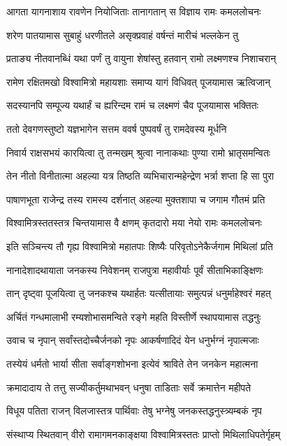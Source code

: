 \twolineshloka
{आगता यागनाशाय रावणेन नियोजिताः}
{तानागतान् स विज्ञाय रामः कमललोचनः} %

\twolineshloka
{शरेण पातयामास सुबाहुं धरणीतले}
{असृक्प्रवाहं वर्षन्तं मारीचं भल्लकेन तु} %

\twolineshloka
{प्रताङ्य नीतवानब्धिं यथा पर्णं तु वायुना}
{शेषांस्तु हतवान् रामो लक्ष्मणश्च निशाचरान्} %

\twolineshloka
{रामेण रक्षितमखो विश्वामित्रो महायशाः}
{समाप्य यागं विधिवत् पूजयामास ऋत्विजान्} %

\twolineshloka
{सदस्यानपि सम्पूज्य यथार्हं च ह्यरिन्दम}
{रामं च लक्ष्मणं चैव पूजयामास भक्तितः} %

\twolineshloka
{ततो देवगणस्तुष्टो यज्ञभागेन सत्तम}
{ववर्ष पुष्पवर्षं तु रामदेवस्य मूर्धनि} %

\twolineshloka
{निवार्य राक्षसभयं कारयित्वा तु तन्मखम्}
{श्रुत्वा नानाकथाः पुण्या रामो भ्रातृसमन्वितः} %

\twolineshloka
{तेन नीतो विनीतात्मा अहल्या यत्र तिष्ठति}
{व्यभिचारान्महेन्द्रेण भर्त्रा शप्ता हि सा पुरा} %

\twolineshloka
{पाषाणभूता राजेन्द्र तस्य रामस्य दर्शनात्}
{अहल्या मुक्तशापा च जगाम गौतमं प्रति} %

\twolineshloka
{विश्वामित्रस्ततस्तत्र चिन्तयामास वै क्षणम्}
{कृतदारो मया नेयो रामः कमललोचनः} %

\twolineshloka
{इति सञ्चिन्त्य तौ गृह्य विश्वामित्रो महातपाः}
{शिष्यैः परिवृतोऽनेकैर्जगाम मिथिलां प्रति} %

\twolineshloka
{नानादेशादथायाता जनकस्य निवेशनम्}
{राजपुत्रा महावीर्याः पूर्वं सीताभिकाङ्क्षिणः} %

\twolineshloka
{तान् दृष्ट्वा पूजयित्वा तु जनकश्च यथार्हतः}
{यत्सीतायाः समुत्पन्नं धनुर्माहेश्वरं महत्} %

\twolineshloka
{अर्चितं गन्धमालाभी रम्यशोभासमन्विते}
{रङ्गे महति विस्तीर्णे स्थापयामास तद्धनुः} %

\twolineshloka
{उवाच च नृपान् सर्वांस्तदोच्चैर्जनको नृपः}
{आकर्षणादिदं येन धनुर्भग्नं नृपात्मजाः} %

\twolineshloka
{तस्येयं धर्मतो भार्या सीता सर्वाङ्गशोभना}
{इत्येवं श्राविते तेन जनकेन महात्मना} %

\twolineshloka
{क्रमादादाय ते तत्तु सज्यीकर्तुमथाभवन्}
{धनुषा ताडिताः सर्वे क्रमात्तेन महीपते} %

\twolineshloka
{विधूय पतिता राजन् विलजास्तत्र पार्थिवाः}
{तेषु भग्नेषु जनकस्तद्धनुस्त्र्यम्बकं नृप} %

\twolineshloka
{संस्थाप्य स्थितवान् वीरो रामागमनकाङ्क्षया}
{विश्वामित्रस्ततः प्राप्तो मिथिलाधिपतेर्गृहम्} %

